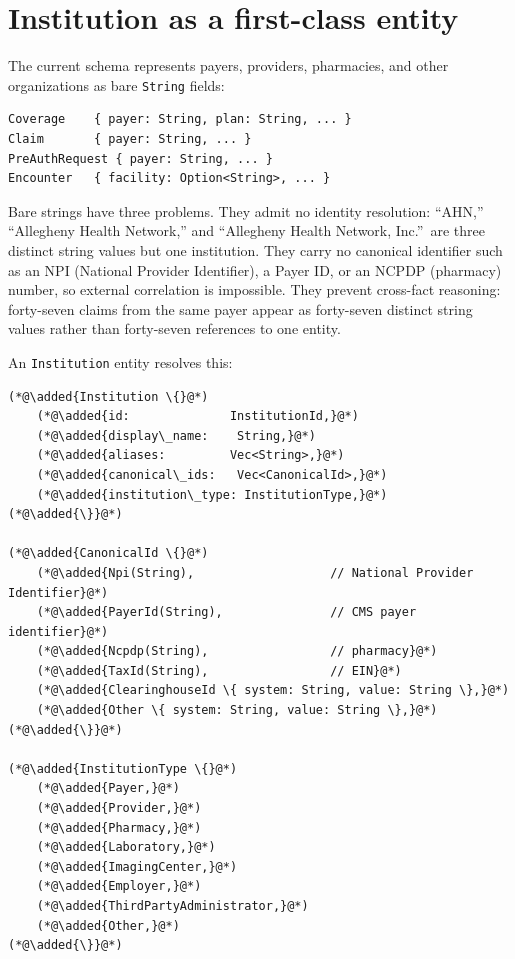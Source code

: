 \documentclass[11pt]{article}
\newcommand{\added}[1]{\textcolor{accentblue}{#1}}
\begin{document}
\section{Institution as a first-class entity}
\label{sec:institution}

The current schema represents payers, providers, pharmacies, and other
organizations as bare \texttt{String} fields:

\begin{lstlisting}
Coverage    { payer: String, plan: String, ... }
Claim       { payer: String, ... }
PreAuthRequest { payer: String, ... }
Encounter   { facility: Option<String>, ... }
\end{lstlisting}

Bare strings have three problems. They admit no identity resolution:
``AHN,'' ``Allegheny Health Network,'' and ``Allegheny Health Network,
Inc.''\ are three distinct string values but one institution. They
carry no canonical identifier such as an NPI (National Provider
Identifier), a Payer ID, or an NCPDP (pharmacy) number, so external
correlation is impossible. They prevent cross-fact reasoning: forty-seven
claims from the same payer appear as forty-seven distinct string values
rather than forty-seven references to one entity.

An \texttt{Institution} entity resolves this:

\begin{lstlisting}
(*@\added{Institution \{}@*)
    (*@\added{id:              InstitutionId,}@*)
    (*@\added{display\_name:    String,}@*)
    (*@\added{aliases:         Vec<String>,}@*)
    (*@\added{canonical\_ids:   Vec<CanonicalId>,}@*)
    (*@\added{institution\_type: InstitutionType,}@*)
(*@\added{\}}@*)

(*@\added{CanonicalId \{}@*)
    (*@\added{Npi(String),                   // National Provider Identifier}@*)
    (*@\added{PayerId(String),               // CMS payer identifier}@*)
    (*@\added{Ncpdp(String),                 // pharmacy}@*)
    (*@\added{TaxId(String),                 // EIN}@*)
    (*@\added{ClearinghouseId \{ system: String, value: String \},}@*)
    (*@\added{Other \{ system: String, value: String \},}@*)
(*@\added{\}}@*)

(*@\added{InstitutionType \{}@*)
    (*@\added{Payer,}@*)
    (*@\added{Provider,}@*)
    (*@\added{Pharmacy,}@*)
    (*@\added{Laboratory,}@*)
    (*@\added{ImagingCenter,}@*)
    (*@\added{Employer,}@*)
    (*@\added{ThirdPartyAdministrator,}@*)
    (*@\added{Other,}@*)
(*@\added{\}}@*)
\end{lstlisting}
\end{document}
